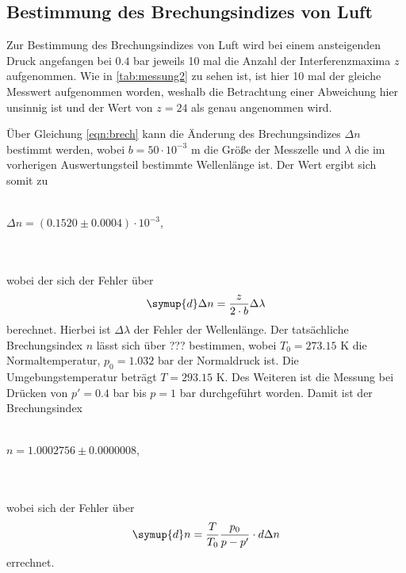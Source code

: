     \subsection{Bestimmung des Brechungsindizes von Luft}
            Zur Bestimmung des Brechungsindizes von Luft wird bei einem ansteigenden Druck angefangen bei $0.4$ bar jeweils 10 mal 
            die Anzahl der Interferenzmaxima $z$ aufgenommen. Wie in \autoref{tab:messung2} zu sehen ist, ist hier 10 mal der gleiche 
            Messwert aufgenommen worden, weshalb die Betrachtung einer Abweichung hier unsinnig ist und der Wert von $z = 24$ als genau 
            angenommen wird.
            
            Über Gleichung \eqref{eqn:brech} kann die Änderung des Brechungsindizes $\Delta n$ bestimmt werden, wobei
            $b = 50 \cdot 10^{-3}$ m die Größe der Messzelle und $\lambda$ die im vorherigen Auswertungsteil bestimmte Wellenlänge ist.
            Der Wert ergibt sich somit zu 
            \\ \\
            \centerline{$\Delta n = (0.1520 \pm 0.0004) \cdot 10^{-3}$,}
            \\ \\
            wobei der sich der Fehler über 
            \begin{equation}
               \symup{d} \Delta n = \frac{z}{2 \cdot b} \Delta \lambda
            \end{equation}
            berechnet. Hierbei ist $\Delta \lambda$ der Fehler der Wellenlänge.
            Der tatsächliche Brechungsindex $n$ lässt sich über ??? bestimmen, wobei $T_0 = 273.15$ K die Normaltemperatur, $p_0 = 1.032$ bar 
            der Normaldruck ist. Die Umgebungstemperatur beträgt $T = 293.15$ K. Des Weiteren ist die Messung bei Drücken von $p' = 0.4$ bar
            bis $p = 1$ bar durchgeführt worden. Damit ist der Brechungsindex
            \\ \\
            \centerline{$n = 1.0002756 \pm 0.0000008$,}
            \\ \\
            wobei sich der Fehler über
            \begin{equation}
                \symup{d} n = \frac{T}{T_0} \frac{p_0}{p- p'} \cdot d \Delta n
            \end{equation}
            errechnet.    